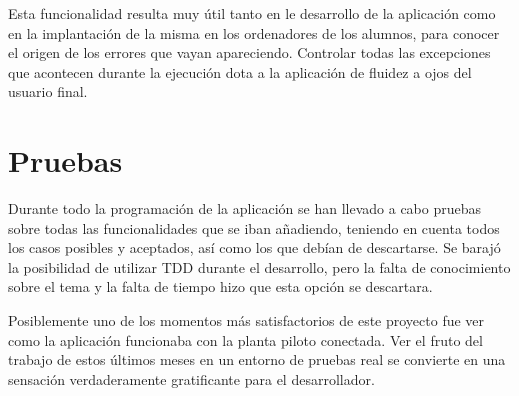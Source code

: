 Esta funcionalidad resulta muy útil tanto en le desarrollo de la aplicación como en la implantación de la misma en los ordenadores de los alumnos, para conocer el origen de los errores que vayan apareciendo. Controlar todas las excepciones que acontecen durante la ejecución dota a la aplicación de fluidez a ojos del usuario final.

\section{Pruebas}

Durante todo la programación de la aplicación se han llevado a cabo pruebas sobre todas las funcionalidades que se iban añadiendo, teniendo en cuenta todos los casos posibles y aceptados, así como los que debían de descartarse. Se barajó la posibilidad de utilizar TDD durante el desarrollo, pero la falta de conocimiento sobre el tema y la falta de tiempo hizo que esta opción se descartara.

Posiblemente uno de los momentos más satisfactorios de este proyecto fue ver como la aplicación funcionaba con la planta piloto conectada. Ver el fruto del trabajo de estos últimos meses en un entorno de pruebas real se convierte en una sensación verdaderamente gratificante para el desarrollador.